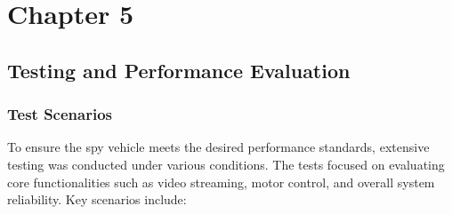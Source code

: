 \documentclass[12pt,a4paper]{report}
\begin{document}
	{\vfill \chapter*{\centering \vfill Chapter 5 \vfill}\vfill}
	\thispagestyle{empty}
	\newpage
	\label{Testing and Performance Evaluation}
	\section{Testing and Performance Evaluation}
	
\label{Test Scenarios}
\subsection{Test Scenarios}
To ensure the spy vehicle meets the desired performance standards, extensive testing was conducted under various conditions. The tests focused on evaluating core functionalities such as video streaming, motor control, and overall system reliability. Key scenarios include:
\end{document}
